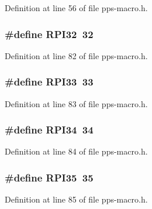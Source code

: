 Definition at line 56 of file pps-\/macro.\+h.

\hypertarget{pps-macro_8h_a894761e0a70976cf879492a19bc9a352}{}
\subsubsection[{R\+P\+I32}]{\setlength{\rightskip}{0pt plus 5cm}\#define R\+P\+I32~32}\label{pps-macro_8h_a894761e0a70976cf879492a19bc9a352}


Definition at line 82 of file pps-\/macro.\+h.

\hypertarget{pps-macro_8h_a6778bd0ed8894d871300ad0e7ee245c5}{}
\subsubsection[{R\+P\+I33}]{\setlength{\rightskip}{0pt plus 5cm}\#define R\+P\+I33~33}\label{pps-macro_8h_a6778bd0ed8894d871300ad0e7ee245c5}


Definition at line 83 of file pps-\/macro.\+h.

\hypertarget{pps-macro_8h_a44f7b58e23056808edfc9e74fee91fd7}{}
\subsubsection[{R\+P\+I34}]{\setlength{\rightskip}{0pt plus 5cm}\#define R\+P\+I34~34}\label{pps-macro_8h_a44f7b58e23056808edfc9e74fee91fd7}


Definition at line 84 of file pps-\/macro.\+h.

\hypertarget{pps-macro_8h_a3ade09c0c466510204e5f62ca356b7c5}{}
\subsubsection[{R\+P\+I35}]{\setlength{\rightskip}{0pt plus 5cm}\#define R\+P\+I35~35}\label{pps-macro_8h_a3ade09c0c466510204e5f62ca356b7c5}


Definition at line 85 of file pps-\/macro.\+h.

\hypertarget{pps-macro_8h_adcfb940538d64a022f788d6fa7b98b05}{}
